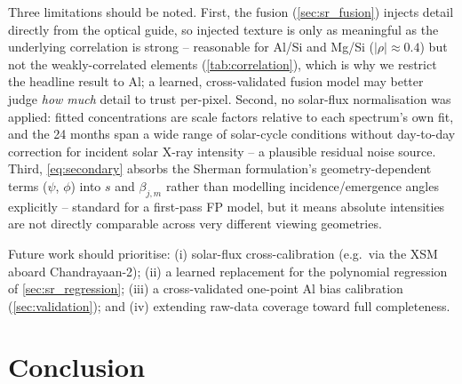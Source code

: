 \documentclass[journal,lettersize]{IEEEtran}
\begin{document}
Three limitations should be noted. First, the fusion
(\cref{sec:sr_fusion}) injects detail directly from the optical guide,
so injected texture is only as meaningful as the underlying correlation
is strong -- reasonable for Al/Si and Mg/Si ($|\rho|\approx0.4$) but not
the weakly-correlated elements (\cref{tab:correlation}), which is why we
restrict the headline result to Al; a learned, cross-validated fusion
model may better judge \emph{how much} detail to trust per-pixel.
Second, no solar-flux normalisation was applied: fitted concentrations
are scale factors relative to each spectrum's own fit, and the 24
months span a wide range of solar-cycle conditions \cite{Hathaway2015}
without day-to-day correction for incident solar X-ray intensity -- a
plausible residual noise source. Third, \cref{eq:secondary} absorbs the
Sherman formulation's geometry-dependent terms ($\psi$, $\phi$) into $s$
and $\beta_{j,m}$ rather than modelling incidence/emergence angles
explicitly -- standard for a first-pass FP model, but it means absolute
intensities are not directly comparable across very different viewing
geometries.

Future work should prioritise: (i) solar-flux cross-calibration (e.g.\
via the XSM aboard Chandrayaan-2); (ii) a learned replacement for the
polynomial regression of \cref{sec:sr_regression}; (iii) a cross-validated
one-point Al bias calibration (\cref{sec:validation}); and (iv) extending
raw-data coverage toward full completeness.

\section{Conclusion}\label{sec:conclusion}
\end{document}
